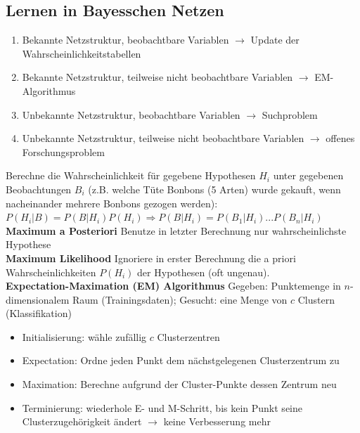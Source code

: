 \documentclass[12pt]{article}
\begin{document}
	\subsection{Lernen in Bayesschen Netzen}
	\begin{enumerate}
		\item Bekannte Netzstruktur, beobachtbare Variablen $\rightarrow$ Update der Wahrscheinlichkeitstabellen
		\item Bekannte Netzstruktur, teilweise nicht beobachtbare Variablen $\rightarrow$ EM-Algorithmus
		\item Unbekannte Netzstruktur, beobachtbare Variablen $\rightarrow$ Suchproblem
		\item Unbekannte Netzstruktur, teilweise nicht beobachtbare Variablen $\rightarrow$ offenes Forschungsproblem
	\end{enumerate}
	Berechne die Wahrscheinlichkeit für gegebene Hypothesen $H_i$ unter gegebenen Beobachtungen $B_i$ (z.B. welche Tüte Bonbons (5 Arten) wurde gekauft, wenn nacheinander mehrere Bonbons gezogen werden): $P(H_i|B) = P(B|H_i) P(H_i) \Rightarrow P(B|H_i) = P(B_1|H_i) ... P(B_n|H_i)$\\
	\textbf{Maximum a Posteriori} Benutze in letzter Berechnung nur wahrscheinlichste Hypothese\\
	\textbf{Maximum Likelihood} Ignoriere in erster Berechnung die a priori Wahrscheinlichkeiten $P(H_i)$ der Hypothesen (oft ungenau).\\
	\textbf{Expectation-Maximation (EM) Algorithmus} Gegeben: Punktemenge in $n$-dimensionalem Raum (Trainingsdaten); Gesucht: eine Menge von $c$ Clustern (Klassifikation)
	\begin{itemize}
		\item Initialisierung: wähle zufällig $c$ Clusterzentren
		\item Expectation: Ordne jeden Punkt dem nächstgelegenen Clusterzentrum zu
		\item Maximation: Berechne aufgrund der Cluster-Punkte dessen Zentrum neu
		\item Terminierung: wiederhole E- und M-Schritt, bis kein Punkt seine Clusterzugehörigkeit ändert $\rightarrow$ keine Verbesserung mehr
	\end{itemize}
	
\end{document}
